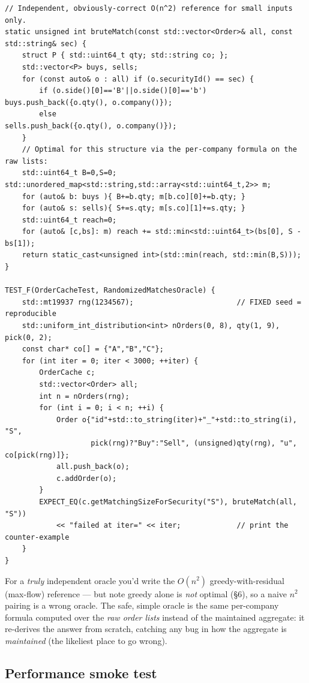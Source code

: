 \begin{lstlisting}
// Independent, obviously-correct O(n^2) reference for small inputs only.
static unsigned int bruteMatch(const std::vector<Order>& all, const std::string& sec) {
    struct P { std::uint64_t qty; std::string co; };
    std::vector<P> buys, sells;
    for (const auto& o : all) if (o.securityId() == sec) {
        if (o.side()[0]=='B'||o.side()[0]=='b') buys.push_back({o.qty(), o.company()});
        else                                    sells.push_back({o.qty(), o.company()});
    }
    // Optimal for this structure via the per-company formula on the raw lists:
    std::uint64_t B=0,S=0; std::unordered_map<std::string,std::array<std::uint64_t,2>> m;
    for (auto& b: buys ){ B+=b.qty; m[b.co][0]+=b.qty; }
    for (auto& s: sells){ S+=s.qty; m[s.co][1]+=s.qty; }
    std::uint64_t reach=0;
    for (auto& [c,bs]: m) reach += std::min<std::uint64_t>(bs[0], S - bs[1]);
    return static_cast<unsigned int>(std::min(reach, std::min(B,S)));
}

TEST_F(OrderCacheTest, RandomizedMatchesOracle) {
    std::mt19937 rng(1234567);                        // FIXED seed = reproducible
    std::uniform_int_distribution<int> nOrders(0, 8), qty(1, 9), pick(0, 2);
    const char* co[] = {"A","B","C"};
    for (int iter = 0; iter < 3000; ++iter) {
        OrderCache c;
        std::vector<Order> all;
        int n = nOrders(rng);
        for (int i = 0; i < n; ++i) {
            Order o{"id"+std::to_string(iter)+"_"+std::to_string(i), "S",
                    pick(rng)?"Buy":"Sell", (unsigned)qty(rng), "u", co[pick(rng)]};
            all.push_back(o);
            c.addOrder(o);
        }
        EXPECT_EQ(c.getMatchingSizeForSecurity("S"), bruteMatch(all, "S"))
            << "failed at iter=" << iter;             // print the counter-example
    }
}
\end{lstlisting}

\begin{intu}
For a \emph{truly} independent oracle you'd write the $O(n^2)$ greedy-with-residual
(max-flow) reference --- but note greedy alone is \emph{not} optimal (\S6), so a
naive $n^2$ pairing is a wrong oracle. The safe, simple oracle is the same
per-company formula computed over the \emph{raw order lists} instead of the
maintained aggregate: it re-derives the answer from scratch, catching any bug in
how the aggregate is \emph{maintained} (the likeliest place to go wrong).
\end{intu}

\subsection{Performance smoke test}

